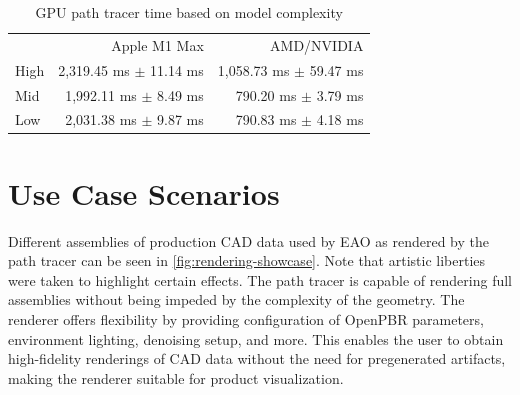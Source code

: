 \begin{table}[H]
  \centering
  \begin{tabular}{lrr}
    \toprule
    & Apple M1 Max    & AMD/NVIDIA \\
    High     & 2,319.45 ms $\pm$ 11.14 ms    & 1,058.73 ms $\pm$ 59.47 ms \\
    Mid     & 1,992.11 ms $\pm$ 8.49 ms    & 790.20 ms $\pm$ 3.79 ms\\
    Low     & 2,031.38 ms $\pm$ 9.87 ms    & 790.83 ms $\pm$ 4.18 ms \\
    \bottomrule
  \end{tabular}
  \caption{\gls{GPU} path tracer time based on model complexity}
  \label{tab:gpuPerformance}
\end{table}
  
\newpage
\section{Use Case Scenarios}

Different assemblies of production \gls{CAD} data used by EAO as rendered by the path tracer can be seen in \autoref{fig:rendering-showcase}. Note that artistic liberties were taken to highlight certain effects. The path tracer is capable of rendering full assemblies without being impeded by the complexity of the geometry. The renderer offers flexibility by providing configuration of \gls{OpenPBR} parameters, environment lighting, denoising setup, and more. This enables the user to obtain high-fidelity renderings of \gls{CAD} data without the need for pregenerated artifacts, making the renderer suitable for product visualization.

